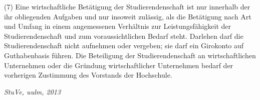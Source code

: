\documentclass[
10pt,
a4paper,
twoside,								%
titlepage=false,							%
draft=false								%
]{scrartcl}
\begin{document}
(7) Eine wirtschaftliche Betätigung der Studierendenschaft ist nur innerhalb der ihr obliegenden Aufgaben und nur insoweit zulässig, als die Betätigung nach Art und Umfang in einem angemessenen Verhältnis zur Leistungsfähigkeit der Studierendenschaft und zum voraussichtlichen Bedarf steht. Darlehen darf die Studierendenschaft nicht aufnehmen oder vergeben; sie darf ein Girokonto auf Guthabenbasis führen. Die Beteiligung der Studierendenschaft an wirtschaftlichen Unternehmen oder die Gründung wirtschaftlicher Unternehmen bedarf der vorherigen Zustimmung des Vorstands der Hochschule.


\newpage
\thispagestyle{empty}
\null
\vfill
\begin{center}
	\textit{StuVe, uulm, 2013}
\end{center}
\end{document}
